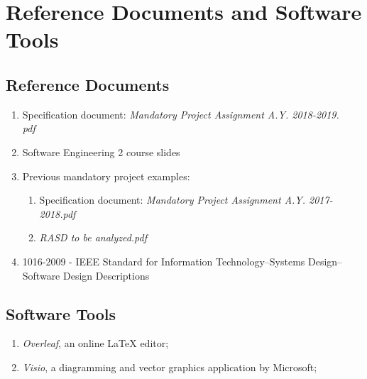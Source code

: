 \section{Reference Documents and Software Tools}

    \subsection{Reference Documents}
        \begin{enumerate}
            \item Specification document: \textit{Mandatory Project Assignment A.Y. 2018-2019.\\pdf}
            
            \item Software Engineering 2 course slides
            
            \item Previous mandatory project examples: 
                \begin{enumerate}
                    \item Specification document: \textit{Mandatory Project Assignment A.Y. 2017-2018.pdf}
                    
                    \item \textit{RASD to be analyzed.pdf}
                \end{enumerate}
                
            \item 1016-2009 - IEEE Standard for Information Technology--Systems Design--Software Design Descriptions
        \end{enumerate}
        
    \subsection{Software Tools}
    
        \begin{enumerate}
            \item \emph{Overleaf}, an online LaTeX editor;
            \item \emph{Visio}, a diagramming and vector graphics application by Microsoft;
        \end{enumerate}